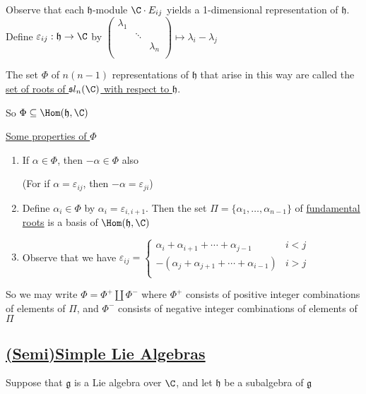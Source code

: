 \documentclass[x11names,reqno,14pt]{extarticle}
\newcommand{\mk}[1]{\mathfrak{#1}}
\newcommand{\g}{\mk{g}}
\newcommand{\h}{\mk{h}}
\begin{document}
Observe that each $\h$-module $\C\cdot E_{ij}$ yields a 1-dimensional representation of $\h$. Define $\varepsilon_{ij}:\h\to\C$ by $\begin{pmatrix} \lambda_1 & & \\ & \ddots & \\ & & \lambda_n \\\end{pmatrix}\mapsto \lambda_i-\lambda_j$

The set $\Phi$ of $n(n-1)$ representations of $\h$ that arise in this way are called the \underline{set of roots of $\mk{s}l_n(\C)$ with respect to $\h$}. 

So $\Phi \subseteq \Hom(\h,\C)$

\underline{Some properties of $\Phi$}

\begin{enumerate}

\item If $\alpha\in \Phi$, then $-\alpha\in\Phi$ also

(For if $\alpha = \varepsilon_{ij}$, then $-\alpha = \varepsilon_{ji}$)

\item Define $\alpha_i\in\Phi$ by $\alpha_i = \varepsilon_{i,i+1}$. Then the set $\Pi = \{\alpha_1, \dots, \alpha_{n-1}\}$ of \underline{fundamental roots} is a basis of $\Hom(\h, \C)$

\item Observe that we have $\varepsilon_{ij} = \begin{cases} \alpha_i + \alpha_{i + 1} + \cdots + \alpha_{j-1} & i < j \\ -(\alpha_j + \alpha_{j+1} + \cdots + \alpha_{i-1}) & i > j \\ \end{cases}$

\end{enumerate}

So we may write $\Phi = \Phi^+ \coprod \Phi^-$ where $\Phi^+$ consists of positive integer combinations of elements of $\Pi$, and $\Phi^-$ consists of negative integer combinations of elements of $\Pi$


\subsection*{\underline{(Semi)Simple Lie Algebras}}


Suppose that $\g$ is a Lie algebra over $\C$, and let $\h$ be a subalgebra of $\g$
\end{document}
